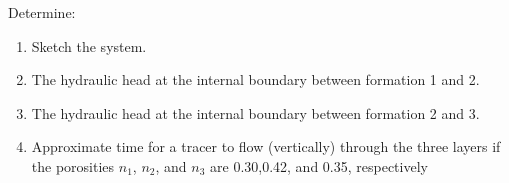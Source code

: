 \documentclass[12pt]{article}
\begin{document}
\begin{enumerate}
Determine:
\begin{enumerate}
\item Sketch the system.
\item The hydraulic head at the internal boundary between formation 1 and 2.
\item The hydraulic head at the internal boundary between formation 2 and 3.
\item Approximate time for a tracer to flow (vertically) through the three layers if the porosities $n_1$, $n_2$, and $n_3$ are 0.30,0.42, and 0.35, respectively
\end{enumerate}

\end{enumerate}
\end{document}
